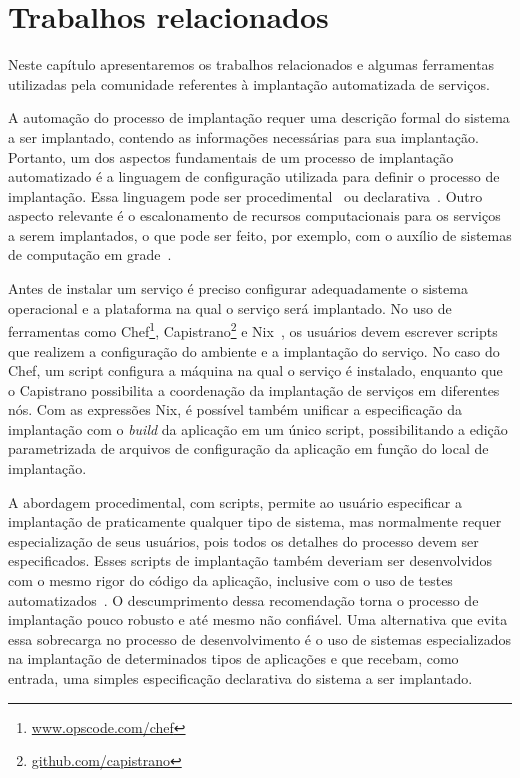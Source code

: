 
\chapter{Trabalhos relacionados}
\label{cap:relacionados}

Neste capítulo apresentaremos os trabalhos relacionados e algumas ferramentas utilizadas pela comunidade referentes à implantação automatizada de serviços. 

A automação do processo de implantação requer uma descrição formal do sistema a ser implantado, contendo as informações necessárias para sua implantação. Portanto, um dos aspectos fundamentais de um processo de implantação automatizado é a linguagem de configuração utilizada para definir o processo de implantação. Essa linguagem pode ser procedimental~\cite{Dolstra2005Configuration} ou declarativa~\cite{Magee1996Dynamic, Balter1998Olan}. Outro aspecto relevante é o escalonamento de recursos computacionais para os serviços a serem implantados, o que pode ser feito, por exemplo, com o auxílio de sistemas de computação em grade~\cite{Watson2006Dynasoar}.

Antes de instalar um serviço é preciso configurar adequadamente o sistema operacional e a plataforma na qual o serviço será implantado. No uso de ferramentas como Chef\footnote{\url{www.opscode.com/chef}}, Capistrano\footnote{\url{github.com/capistrano}} e Nix~\cite{Dolstra2005Configuration}, os usuários devem escrever scripts que realizem a configuração do ambiente e a implantação do serviço. No caso do Chef, um script configura a máquina na qual o serviço é instalado, enquanto que o Capistrano possibilita a coordenação da implantação de serviços em diferentes nós. Com as expressões Nix, é possível também unificar a especificação da implantação com o \textit{build} da aplicação em um único script, possibilitando a edição parametrizada de arquivos de configuração da aplicação em função do local de implantação. 

A abordagem procedimental, com scripts, permite ao usuário especificar a implantação de praticamente qualquer tipo de sistema, mas normalmente requer especialização de seus usuários, pois todos os detalhes do processo devem ser especificados. Esses scripts de implantação também deveriam ser desenvolvidos com o mesmo rigor do código da aplicação, inclusive com o uso de testes automatizados~\cite{Humble2011Continuous}. O descumprimento dessa recomendação torna o processo de implantação pouco robusto e até mesmo não confiável. Uma alternativa que evita essa sobrecarga no processo de desenvolvimento é o uso de sistemas especializados na implantação de determinados tipos de aplicações e que recebam, como entrada, uma simples especificação declarativa do sistema a ser implantado.

